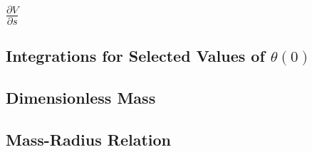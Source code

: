 \documentclass[11pt]{article} %
\newcommand{\pder}[2][]{\frac{\partial#1}{\partial#2}}
\begin{document}
\subsection*{$\pder[V]{s}$}
\subsection*{Integrations for Selected Values of $\theta(0)$}


\subsection*{Dimensionless Mass}

\subsection*{Mass-Radius Relation}
\end{document}
